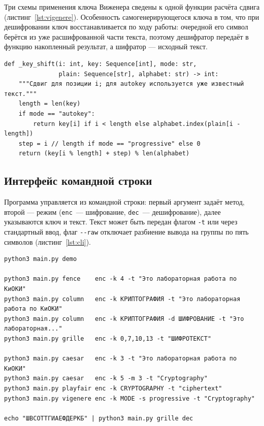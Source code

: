 \documentclass[14pt,a4paper]{extarticle}
\begin{document}
Три схемы применения ключа Виженера сведены к одной функции расчёта сдвига
(листинг~\ref{lst:vigenere}). Особенность самогенерирующегося ключа в том, что при
дешифровании ключ восстанавливается по ходу работы: очередной его символ берётся из
уже расшифрованной части текста, поэтому дешифратор передаёт в функцию накопленный
результат, а шифратор --- исходный текст.

\begin{lstlisting}[style=python, caption={Три схемы применения ключа Виженера}, label={lst:vigenere}]
def _key_shift(i: int, key: Sequence[int], mode: str,
               plain: Sequence[str], alphabet: str) -> int:
    """Сдвиг для позиции i; для autokey используется уже известный текст."""
    length = len(key)
    if mode == "autokey":
        return key[i] if i < length else alphabet.index(plain[i - length])
    step = i // length if mode == "progressive" else 0
    return (key[i % length] + step) % len(alphabet)
\end{lstlisting}

\subsection{Интерфейс командной строки}

Программа управляется из командной строки: первый аргумент задаёт метод, второй ---
режим (\texttt{enc}~--- шифрование, \texttt{dec}~--- дешифрование), далее указываются
ключ и текст. Текст может быть передан флагом \texttt{-t} или через стандартный ввод,
флаг \texttt{-{}-raw} отключает разбиение вывода на группы по пять символов
(листинг~\ref{lst:cli}).

\begin{lstlisting}[style=shell, caption={Примеры запуска}, label={lst:cli}]
python3 main.py demo

python3 main.py fence    enc -k 4 -t "Это лабораторная работа по КиОКИ"
python3 main.py column   enc -k КРИПТОГРАФИЯ -t "Это лабораторная работа по КиОКИ"
python3 main.py column   enc -k КРИПТОГРАФИЯ -d ШИФРОВАНИЕ -t "Это лабораторная..."
python3 main.py grille   enc -k 0,7,10,13 -t "ШИФРОТЕКСТ"

python3 main.py caesar   enc -k 3 -t "Это лабораторная работа по КиОКИ"
python3 main.py caesar   enc -k 5 -m 3 -t "Cryptography"
python3 main.py playfair enc -k CRYPTOGRAPHY -t "ciphertext"
python3 main.py vigenere enc -k MODE -s progressive -t "Cryptography"

echo "ШВСОТТГИАЕФДЕРКБ" | python3 main.py grille dec
\end{lstlisting}
\end{document}

